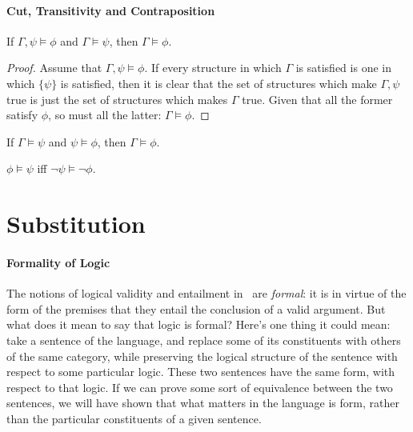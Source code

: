 \paragraph{Cut, Transitivity and Contraposition}

\begin{theorem}[Cut] If $\Gamma, \psi \vDash \phi$ and $\Gamma \vDash \psi$, then $\Gamma \vDash \phi$. \begin{proof}
	Assume that $\Gamma, \psi \vDash \phi$. If every structure in which $\Gamma$ is satisfied is one in which $\{\psi\}$ is satisfied, then it is clear that the set of structures
	which make $\Gamma, \psi$ true is just the set of structures which makes 
	$\Gamma$ true. Given that all the former satisfy $\phi$, so must all the latter: $\Gamma \vDash \phi$.
\end{proof}
\end{theorem}
\begin{theorem}[Transitivity]
	If $\Gamma \vDash \psi$ and $\psi \vDash \phi$, then $\Gamma \vDash \phi$.
\end{theorem}

\begin{theorem}[Contraposition]
$\phi \vDash \psi$ iff $\neg \psi \vDash \neg \phi$.
	
\end{theorem}




\section{Substitution}

\paragraph{Formality of Logic} The notions of logical validity and entailment in \lone\ are \emph{formal}: it is in virtue of the form of the premises that they entail the conclusion of a valid argument. But what does it mean to say that logic is formal? Here's one thing it could mean: take a sentence of the language, and replace some of its constituents with others of the same category, while preserving the logical structure of the sentence with respect to some particular logic. These two sentences have the same form, with respect to that logic. If we can prove some sort of equivalence between the two sentences, we will have shown that what matters in the language is form, rather than the particular constituents of a given sentence. 

